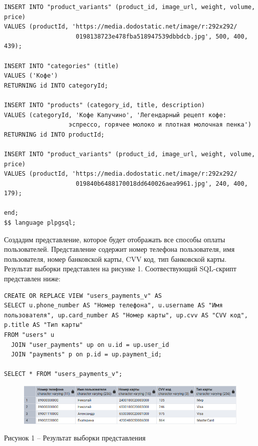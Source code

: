 \documentclass[a4paper,14pt]{extarticle}
\begin{document}
\begin{Verbatim}[tabsize=4,fontsize=\small]
INSERT INTO "product_variants" (product_id, image_url, weight, volume, price)
VALUES (productId, 'https://media.dodostatic.net/image/r:292x292/
                    0198138723e478fba518947539dbbdcb.jpg', 500, 400, 439);

INSERT INTO "categories" (title)
VALUES ('Кофе')
RETURNING id INTO categoryId;

INSERT INTO "products" (category_id, title, description)
VALUES (categoryId, 'Кофе Капучино', 'Легендарный рецепт кофе: 
                  эспрессо, горячее молоко и плотная молочная пенка')
RETURNING id INTO productId;

INSERT INTO "product_variants" (product_id, image_url, weight, volume, price)
VALUES (productId, 'https://media.dodostatic.net/image/r:292x292/
                    019840b6488170018dd640026aea9961.jpg', 240, 400, 179);

end;
$$ language plpgsql;
  \end{Verbatim}

  Создадим представление, которое будет отображать все способы оплаты пользователей. Представление содержит номер телефона пользователя, имя пользователя, номер банковской карты, CVV код, тип банковской карты. Результат выборки представлен на рисунке 1. Соотвествующий SQL-скрипт представлен ниже:

    \noindent
  \begin{Verbatim}[tabsize=4,fontsize=\small]
CREATE OR REPLACE VIEW "users_payments_v" AS
SELECT u.phone_number AS "Номер телефона", u.username AS "Имя пользователя", up.card_number AS "Номер карты", up.cvv AS "CVV код", p.title AS "Тип карты"
FROM "users" u
  JOIN "user_payments" up on u.id = up.user_id
  JOIN "payments" p on p.id = up.payment_id;

SELECT * FROM "users_payments_v";
  \end{Verbatim}

  \begin{figure}[h]
    \centering
    \includegraphics[width=1\linewidth]{img/view-1}
  \end{figure}
  \begin{center}
    Рисунок 1 – Результат выборки представления
  \end{center}
\end{document}
